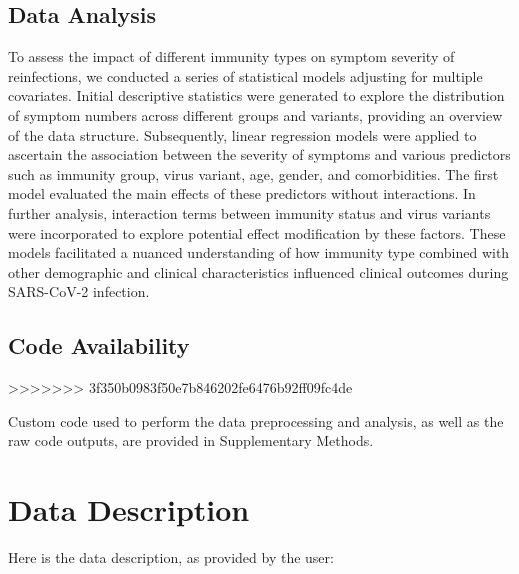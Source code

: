 \documentclass[11pt]{article}
\begin{document}
\subsection*{Data Analysis}
To assess the impact of different immunity types on symptom severity of reinfections, we conducted a series of statistical models adjusting for multiple covariates. Initial descriptive statistics were generated to explore the distribution of symptom numbers across different groups and variants, providing an overview of the data structure. Subsequently, linear regression models were applied to ascertain the association between the severity of symptoms and various predictors such as immunity group, virus variant, age, gender, and comorbidities. The first model evaluated the main effects of these predictors without interactions. In further analysis, interaction terms between immunity status and virus variants were incorporated to explore potential effect modification by these factors. These models facilitated a nuanced understanding of how immunity type combined with other demographic and clinical characteristics influenced clinical outcomes during SARS-CoV-2 infection.\subsection*{Code Availability}
>>>>>>> 3f350b0983f50e7b846202fe6476b92ff09fc4de

Custom code used to perform the data preprocessing and analysis, as well as the raw code outputs, are provided in Supplementary Methods.






\clearpage
\appendix

\section{Data Description} \label{sec:data_description} Here is the data description, as provided by the user:
\end{document}
